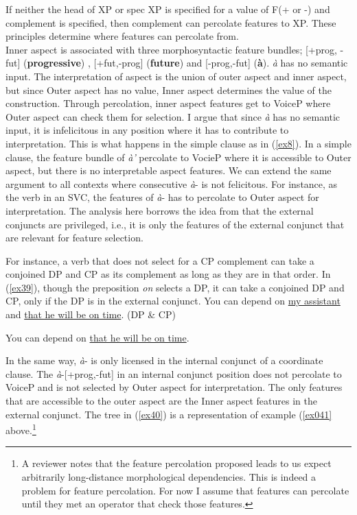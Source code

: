 \documentclass[output=paper,
modfonts
]{langscibook}
\begin{document}
\ex If neither the head of XP or spec XP is specified for a value of F(+ or -) and complement is specified, then complement can percolate features to XP. 
\z
\z
These principles determine where features can percolate from.\\ 
Inner aspect is associated with three morphosyntactic feature bundles; [+prog, -fut] (\textbf{progressive}) , [+fut,-prog] (\textbf{future}) and [-prog,-fut] (\textbf{\`a}).  \emph{\`a} has no semantic input. The interpretation of aspect is the union of outer aspect and inner aspect, but since Outer aspect has no value, Inner aspect determines the value of the construction. Through percolation, inner aspect features get to VoiceP where Outer aspect can check them for selection.  I argue that since \emph{\`a} has no semantic input, it is infelicitous in any position where it has to contribute to interpretation. This is what happens in the simple clause as in (\ref{ex8}). In a simple clause, the feature bundle of \emph{\`a'}  percolate to VocieP where it is accessible to Outer aspect, but there is no interpretable aspect features. We can extend the same argument to all contexts where consecutive \emph{\`a}- is not felicitous. For instance, as the verb in an SVC, the features of \emph{\`a}- has to percolate to Outer aspect for interpretation. The analysis here borrows the idea from  \citet{Zhang2010} that the external conjuncts are privileged, i.e., it is only the features of the external conjunct that are relevant for feature selection. 

For instance, a verb that does not select for a CP complement can take a conjoined DP and CP as its complement as long as they are in that order. In (\ref{ex39}), though the preposition \emph{ on} selects a DP, it can take a conjoined DP and CP, only if the DP is in the external conjunct.
\ea\label{ex39}
\ea You can depend on \underline{my assistant} and \underline{that he will be on time}. (DP \& CP)

\ex You can depend on \underline{that he will be on time}.

\z 
\z  In the same way, \emph{\`a}-  is only licensed in the internal conjunct of a coordinate clause. The \emph{\`a}-[+prog,-fut] in an internal conjunct position does not percolate to VoiceP and is not selected by Outer aspect for interpretation. The only features that are accessible to the outer aspect are the Inner aspect features in the external conjunct. The tree in (\ref{ex40}) is a representation of example (\ref{ex041} above.\footnote{A reviewer notes that the feature percolation proposed leads to us expect arbitrarily long-distance morphological dependencies. This is indeed a problem for feature percolation. For now I assume that features can percolate until they met an operator that check those features.}  
\ea \label{ex40}
\end{document}
